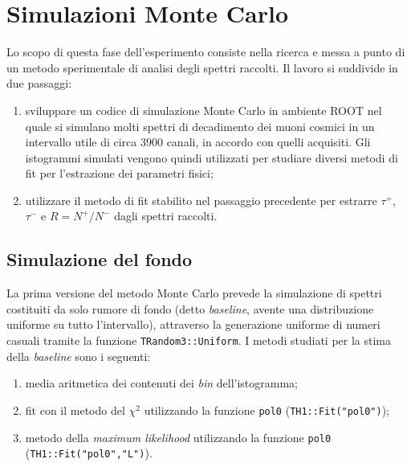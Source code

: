 \documentclass[10pt, oneside, a4paper]{article}   	%
\begin{document}
%
\cleardoublepage
\section{Simulazioni Monte Carlo}
Lo scopo di questa fase dell'esperimento consiste nella ricerca e messa a punto di un metodo sperimentale di analisi degli spettri raccolti. Il lavoro si suddivide in due passaggi:
\begin{enumerate}
 \item sviluppare un codice di simulazione Monte Carlo in ambiente ROOT \cite{root} nel quale si simulano molti spettri di decadimento dei muoni cosmici in un intervallo utile di circa 3900 canali, in accordo con quelli acquisiti. Gli istogrammi simulati vengono quindi utilizzati per studiare diversi metodi di fit per l'estrazione dei parametri fisici;
 \item utilizzare il metodo di fit stabilito nel passaggio precedente per estrarre $\tau^+$, $\tau^-$ e $R=N^+/N^-$ dagli spettri raccolti.
\end{enumerate}
%
\subsection{Simulazione del fondo}
La prima versione del metodo Monte Carlo prevede la simulazione di spettri costituiti da solo rumore di fondo (detto \textit{baseline}, avente una distribuzione uniforme su tutto l'intervallo), attraverso la generazione uniforme di numeri casuali tramite la funzione \lstinline{TRandom3::Uniform}. I metodi studiati per la stima della \textit{baseline} sono i seguenti:
\begin{enumerate}
 \item media aritmetica dei contenuti dei \emph{bin} dell'istogramma;
 \item fit con il metodo del $\chi^2$ utilizzando la funzione \lstinline{pol0} (\lstinline{TH1::Fit("pol0")});
 \item metodo della \textit{maximum likelihood} utilizzando la funzione \lstinline{pol0} \newline (\lstinline{TH1::Fit("pol0","L")}).
\end{enumerate}
\end{document}
